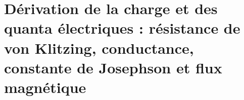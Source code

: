 \HMTFlushCurrentChapter
\chapter{Dérivation de la charge et des quanta électriques : résistance de von Klitzing, conductance, constante de Josephson et flux magnétique}%
\begingroup
\renewcommand{\chapter}[2][]{}%
%
\endgroup

\HMTFlushCurrentChapter
\chapter{Caractères quadratiques et constantes spectrales : Catalan, Apéry, Euler--Mascheroni et hiérarchie de Stieltjes}%
\begingroup
\renewcommand{\chapter}[2][]{}%
%
\endgroup

\HMTFlushCurrentChapter
\chapter{Constantes d'Euler--Kronecker et distributions premières : caractères dodécaphasiques, Meissel--Mertens et séries de nombres premiers jumeaux}%
\begingroup
\renewcommand{\chapter}[2][]{}%
%
\endgroup

\HMTFlushCurrentChapter
\chapter{Famille Bendersky--Glaisher--Kinkelin : produits réguliers, dérivées de la fonction zêta et hiérarchies de normalisation}%
\begingroup
\renewcommand{\chapter}[2][]{}%
%
\endgroup

